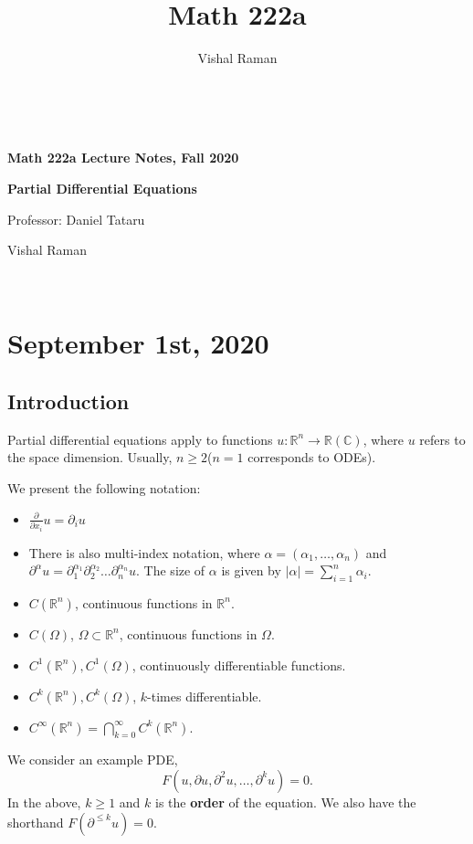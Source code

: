 \documentclass[11pt]{scrartcl}
\newcommand{\R}{\mathbb{R}}
\newcommand{\C}{\mathbb C}
\begin{document}
\title{Math 222a}
\author{Vishal Raman}
\thispagestyle{empty}
$ $
\vfill
\begin{center}

\centerline{\huge \textbf{Math 222a Lecture Notes, Fall 2020}}
\centerline{\Large \textbf{Partial Differential Equations} } 
\centerline{Professor: Daniel Tataru}
\centerline{Vishal Raman}
\end{center}
\vfill
$ $
\newpage
\thispagestyle{empty}
\tableofcontents
\newpage
\section{September 1st, 2020}
\subsection{Introduction}
Partial differential equations apply to functions $u: \R^n \rightarrow \R(\C)$, where $u$ refers to the space dimension.  Usually, $n \ge 2$($n=1$ corresponds to ODEs).   

We present the following notation: \begin{itemize}
\item $\frac{\partial}{\partial x_i} u = \partial_i u$
\item There is also multi-index notation, where $\alpha = (\alpha_1, \dots, \alpha_n)$ and $\partial^\alpha u = \partial_1^{\alpha_1}\partial_2^{\alpha_2} \dots \partial_n^{\alpha_n} u$.  The size of $\alpha$ is given by $|\alpha| = \sum_{i=1}^n \alpha_i$.
\item $C(\R^n)$, continuous functions in $\R^n$.
\item $C(\Omega)$, $\Omega \subset \R^n$, continuous functions in $\Omega$.
\item $C^1(\R^n), C^1(\Omega)$, continuously differentiable functions.
\item $C^k(\R^n), C^k(\Omega)$, $k$-times differentiable.
\item $C^\infty(\R^n) = \bigcap_{k=0}^{\infty} C^k(\R^n)$.
\end{itemize}

We consider an example PDE, 
$$F(u, \partial u, \partial^2 u, \dots, \partial^k u) = 0.$$
In the above, $k \ge 1$ and $k$ is the \textbf{order} of the equation.  We also have the shorthand $F(\partial ^{\le k}u) = 0$.  
\end{document}

